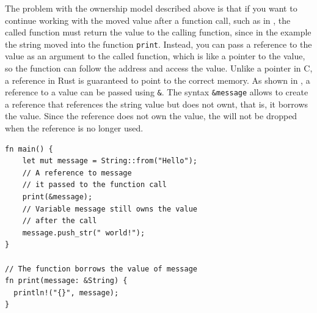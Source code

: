 \documentclass[paper=a4,%
  twoside,%
  BCOR4mm,%
  abstract=true,%
  toc=bibliography,%
  chapterprefix=true,%
  toc=bibliographynumbered,%
  open=right,%
  english,%
  pagesize=pdftex]{scrreprt}
\begin{document}

The problem with the ownership model described above is that if you want to continue working with the moved value after a function call, such as in , the called function must return the value to the calling function, since in the example the string moved into the function \texttt{print}. Instead, you can pass a reference to the value as an argument to the called function, which is like a pointer to the value, so the function can follow the address and access the value. Unlike a pointer in C, a reference in Rust is guaranteed to point to the correct memory. As shown in , a reference to a value can be passed using \texttt{\string&}. The syntax \texttt{\string&message} allows to create a reference that references the string value but does not ownt, that is, it borrows the value. Since the reference does not own the value, the will not be dropped when the reference is no longer used.

\begin{lstlisting}[style=boxed, caption={Transferring the ownership to a method}, label=lst:borrowing-method-call]
fn main() {
    let mut message = String::from("Hello");
    // A reference to message
    // it passed to the function call
    print(&message);
    // Variable message still owns the value
    // after the call
    message.push_str(" world!");
}

// The function borrows the value of message
fn print(message: &String) {
  println!("{}", message);
}
\end{lstlisting}
\end{document}
